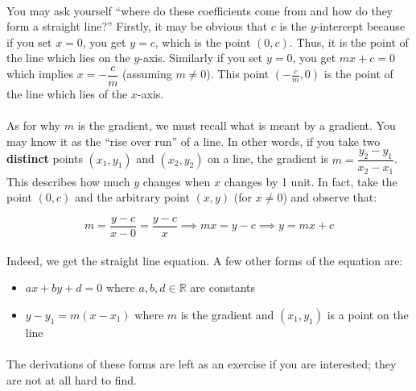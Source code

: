 \documentclass[12pt, a4paper, titlepage, twoside]{article}
\newcommand*{\R}{\mathbb{R}}
\begin{document}
	\paragraph{}
	You may ask yourself ``where do these coefficients come from and how do they form a straight line?'' Firstly, it may be obvious
	that $c$ is the $y$-intercept because if you set $x=0$, you get $y=c$, which is the point $(0,c)$. Thus, it is the point of the line
	which lies on the $y$-axis. Similarly if you set $y=0$, you get $mx+c = 0$ which implies $x = -\dfrac{c}{m}$ (assuming $m \neq 0$).
	This point $(-\frac{c}{m},0)$ is the point of the line which lies of the $x$-axis.
	
	\paragraph{}
	As for why $m$ is the gradient, we must recall what is meant by a gradient. You may know it as the ``rise over run'' of a line.
	In other words, if you take two \textbf{distinct} points $(x_1, y_1)$ and $(x_2, y_2)$ on a line, the gradient is 
	$m = \dfrac{y_2 - y_1}{x_2 - x_1}$. This describes how much $y$ changes when $x$ changes by 1 unit. In fact, take the point
	$(0, c)$ and the arbitrary point $(x,y)$ (for $x \neq 0$) and observe that:
	
	$$m = \dfrac{y-c}{x-0} = \dfrac{y-c}{x} \implies mx = y - c \implies y = mx + c$$
	
	\paragraph{}
	Indeed, we get the straight line equation. A few other forms of the equation are:
	
	\begin{itemize}
		\item $ax + by + d = 0$ where $a,b,d \in \R$ are constants
		\item $y - y_1 = m(x - x_1)$ where $m$ is the gradient and $(x_1, y_1)$ is a point on the line
	\end{itemize}	 
	
	\paragraph{}
	The derivations of these forms are left as an exercise if you are interested; they are not at all hard to find.\\
	
\end{document}
